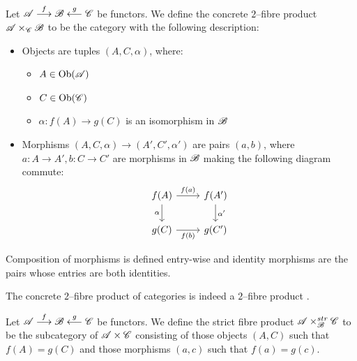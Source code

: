 \documentclass[11pt]{amsart}
\begin{document}
\begin{defn}\label{defn:conc-fibre-prod}
Let $\sA \to[f] \sB \ot[g] \sC$ be functors. We define the concrete
$2$--fibre product $\mathscr{A} \times_\mathscr{C} \mathscr{B}$ to be the category with the following description:
\begin{itemize}
\item Objects are tuples $(A, C, \alpha)$, where:
    \begin{itemize}
    \item $A \in \Ob{\sA}$
    \item $C \in \Ob{\sC}$
    \item $\alpha : f(A) \to g(C)$ is an isomorphism in $\mathscr{B}$
    \end{itemize}
\item Morphisms $(A, C, \alpha) \to (A', C', \alpha')$ are pairs $(a, b)$, where
    $a : A \to A', b : C \to C'$ are morphisms in $\mathscr{B}$ making the following
    diagram commute:
    \[\begin{tikzcd}
    f(A) \ar[r, "f(a)"] \ar[d, "\alpha" left] & f(A') \ar[d, "\alpha'"] \\
    g(C) \ar[r, "f(b)" below] & g(C')
    \end{tikzcd}\]
\end{itemize}
Composition of morphisms is defined entry-wise and identity morphisms are the pairs whose entries
are both identities.
\end{defn}

\begin{rmk}
The concrete $2$--fibre product of categories is indeed a $2$--fibre product
\cite[\href{https://stacks.math.columbia.edu/tag/0040}{Lemma 0040}]{stacks-project}.
\end{rmk}

\begin{defn}
Let $\sA \to[f] \sB \ot[g] \sC$ be functors. We define the strict fibre product
$\mathscr{A} \times_\mathscr{B}^{str} \mathscr{C}$ to be the subcategory of $\mathscr{A} \times \mathscr{C}$ consisting of
those objects $(A, C)$ such that $f(A) = g(C)$ and those morphisms $(a, c)$ such that
$f(a) = g(c)$.
\end{defn}
\end{document}
